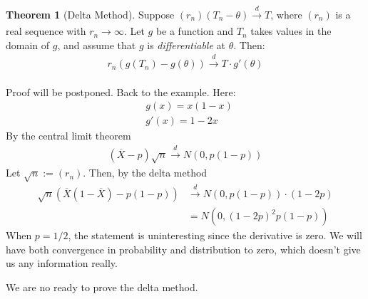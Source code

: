 \documentclass[11pt]{scrartcl}
\theoremstyle{definition}
\newtheorem{theorem}{Theorem}
\theoremstyle{remark}
\begin{document}
\begin{theorem}[Delta Method]
	Suppose $(r_n)(T_n - \theta) \xrightarrow[]{d} T$, where $(r_n)$ is a real sequence with $r_n \rightarrow \infty$. Let $g$ be a function and $T_n$ takes values in the domain of $g$, and assume that $g$ is \emph{differentiable} at $\theta$. Then: 
	\begin{align}
		r_n ( g(T_n) - g(\theta)) \xrightarrow[]{d} T \cdot g'(\theta) 
	\end{align}
\end{theorem}
Proof will be postponed. Back to the example. Here: 
\begin{align*}
	& g(x) = x(1-x) \\
	& g'(x) = 1-2x 	
\end{align*}
By the central limit theorem
\begin{align*}
	(\overline{X} - p) \sqrt{n} \xrightarrow[]{d} N (0, p(1-p)) 	
\end{align*}
Let $\sqrt{n} := (r_n)$. Then, by the delta method
\begin{align*}
	\sqrt{n} (\overline{X} (1 - \overline{X} ) - p(1-p)) & \xrightarrow[]{d} N(0, p(1-p)) \cdot (1-2p) \\ 
		& = N(0, (1-2p)^2p(1-p)) 
\end{align*}
When $p=1/2$, the statement is uninteresting since the derivative is zero. We will have both convergence in probability and distribution to zero, which doesn't give us any information really. 

We are no ready to prove the delta method. 
\end{document}
